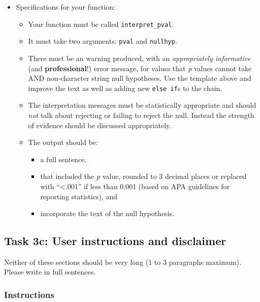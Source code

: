 \documentclass[
  openany]{book}
\providecommand{\tightlist}{%
  \setlength{\itemsep}{0pt}\setlength{\parskip}{0pt}}
\begin{document}
\begin{itemize}
\tightlist
\item
  Specifications for your function:

  \begin{itemize}
  \tightlist
  \item
    Your function must be called \texttt{interpret\_pval}.
  \item
    It must take two arguments: \texttt{pval} and \texttt{nullhyp}.
  \item
    There must be an warning produced, with an \emph{appropriately informative} (and \textbf{professional}!) error message, for values that \emph{p} values cannot take AND non-character string null hypotheses. Use the template above and improve the text as well as adding new \texttt{else\ if}s to the chain.
  \item
    The interpretation messages must be statistically appropriate and should \emph{not} talk about rejecting or failing to reject the null. Instead the strength of evidence should be discussed appropriately.
  \item
    The output should be:

    \begin{itemize}
    \tightlist
    \item
      a full sentence,
    \item
      that included the \emph{p} value, rounded to 3 decimal places or replaced with ``\textless.001'' if less than 0.001 (based on APA guidelines for reporting statistics), and
    \item
      incorporate the text of the null hypothesis.
    \end{itemize}
  \end{itemize}
\end{itemize}

\hypertarget{task-3c-user-instructions-and-disclaimer}{%
\subsection{Task 3c: User instructions and disclaimer}\label{task-3c-user-instructions-and-disclaimer}}

Neither of these sections should be very long (1 to 3 paragraphs maximum). Please write in full sentences.

\hypertarget{instructions}{%
\subsubsection{Instructions}\label{instructions}}
\end{document}

